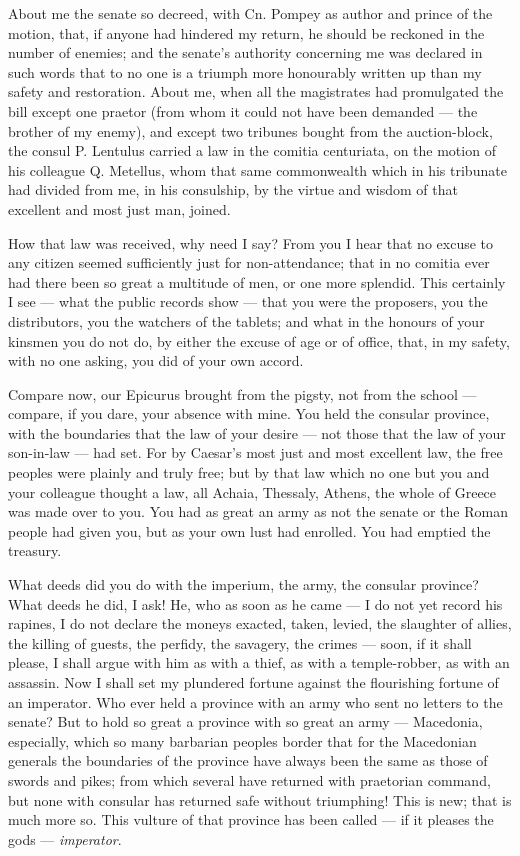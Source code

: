  About me the senate so decreed, with Cn. Pompey as author and prince of the motion, that, if anyone had hindered my return, he should be reckoned in the number of enemies; and the senate's authority concerning me was declared in such words that to no one is a triumph more honourably written up than my safety and restoration. About me, when all the magistrates had promulgated the bill except one praetor (from whom it could not have been demanded — the brother of my enemy), and except two tribunes bought from the auction-block, the consul P. Lentulus carried a law in the comitia centuriata, on the motion of his colleague Q. Metellus, whom that same commonwealth which in his tribunate had divided from me, in his consulship, by the virtue and wisdom of that excellent and most just man, joined.

 How that law was received, why need I say? From you I hear that no excuse to any citizen seemed sufficiently just for non-attendance; that in no comitia ever had there been so great a multitude of men, or one more splendid. This certainly I see — what the public records show — that you were the proposers, you the distributors, you the watchers of the tablets; and what in the honours of your kinsmen you do not do, by either the excuse of age or of office, that, in my safety, with no one asking, you did of your own accord.

 Compare now, our Epicurus brought from the pigsty, not from the school — compare, if you dare, your absence with mine. You held the consular province, with the boundaries that the law of your desire — not those that the law of your son-in-law — had set. For by Caesar's most just and most excellent law, the free peoples were plainly and truly free; but by that law which no one but you and your colleague thought a law, all Achaia, Thessaly, Athens, the whole of Greece was made over to you. You had as great an army as not the senate or the Roman people had given you, but as your own lust had enrolled. You had emptied the treasury.

 What deeds did you do with the imperium, the army, the consular province? What deeds he did, I ask! He, who as soon as he came — I do not yet record his rapines, I do not declare the moneys exacted, taken, levied, the slaughter of allies, the killing of guests, the perfidy, the savagery, the crimes — soon, if it shall please, I shall argue with him as with a thief, as with a temple-robber, as with an assassin. Now I shall set my plundered fortune against the flourishing fortune of an imperator. Who ever held a province with an army who sent no letters to the senate? But to hold so great a province with so great an army — Macedonia, especially, which so many barbarian peoples border that for the Macedonian generals the boundaries of the province have always been the same as those of swords and pikes; from which several have returned with praetorian command, but none with consular has returned safe without triumphing! This is new; that is much more so. This vulture of that province has been called — if it pleases the gods — \textit{imperator}.

